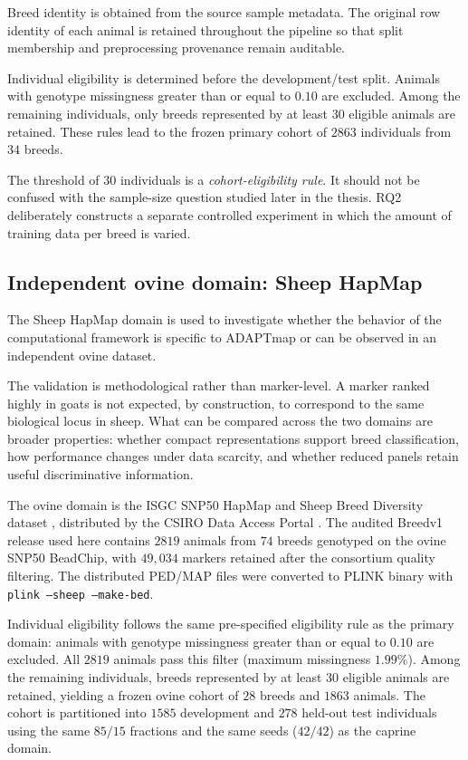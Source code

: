 Breed identity is obtained from the source sample metadata. The
original row identity of each animal is retained throughout the
pipeline so that split membership and preprocessing provenance remain
auditable.

Individual eligibility is determined before the development/test
split. Animals with genotype missingness greater than or equal to
$0.10$ are excluded. Among the remaining individuals, only breeds
represented by at least $30$ eligible animals are retained. These
rules lead to the frozen primary cohort of $2863$ individuals from
$34$ breeds.

The threshold of $30$ individuals is a \emph{cohort-eligibility
rule}. It should not be confused with the sample-size question studied
later in the thesis. RQ2 deliberately constructs a separate controlled
experiment in which the amount of training data per breed is varied.

\subsection{Independent ovine domain: Sheep HapMap}
\label{subsec:sheep_hapmap_dataset}

The Sheep HapMap domain is used to investigate whether the behavior of
the computational framework is specific to ADAPTmap or can be
observed in an independent ovine dataset.

The validation is methodological rather than marker-level. A marker
ranked highly in goats is not expected, by construction, to
correspond to the same biological locus in sheep. What can be compared
across the two domains are broader properties: whether compact
representations support breed classification, how performance changes
under data scarcity, and whether reduced panels retain useful
discriminative information.

The ovine domain is the ISGC SNP50 HapMap and Sheep Breed Diversity
dataset \cite{kijas2012sheep}, distributed by the CSIRO Data Access
Portal \cite{csiroSheepHapMap2013}. The audited Breedv1 release used
here contains $2819$ animals from $74$ breeds genotyped on the ovine
SNP50 BeadChip, with $49{,}034$ markers retained after the consortium
quality filtering. The distributed PED/MAP files were converted to
PLINK binary with \texttt{plink --sheep --make-bed}.

Individual eligibility follows the same pre-specified eligibility rule as the primary
domain: animals with genotype missingness greater than or equal to
$0.10$ are excluded. All $2819$ animals pass this filter (maximum
missingness $1.99\%$). Among the remaining individuals, breeds
represented by at least $30$ eligible animals are retained, yielding a
frozen ovine cohort of $28$ breeds and $1863$ animals. The cohort is
partitioned into $1585$ development and $278$ held-out test individuals
using the same $85/15$ fractions and the same seeds ($42/42$) as the
caprine domain.

